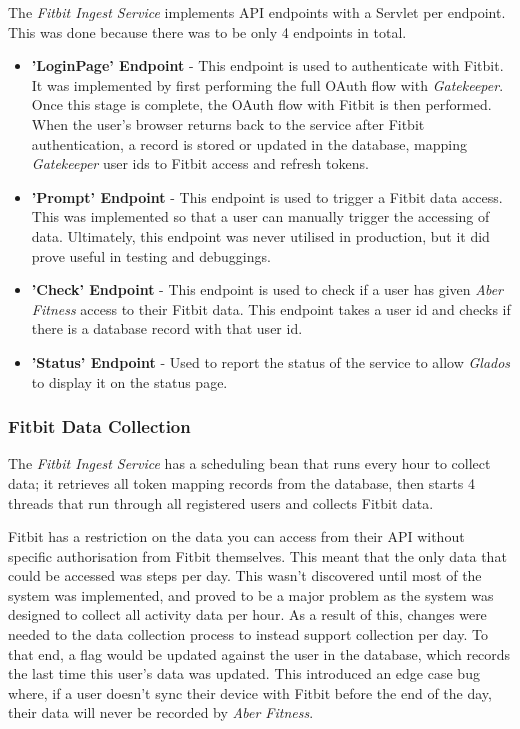The \textit{Fitbit Ingest Service} implements API endpoints with a Servlet per endpoint. This was done because there was to be only 4 endpoints in total.

\begin{itemize}
	\item \textbf{'LoginPage' Endpoint} - This endpoint is used to authenticate with Fitbit. It was implemented by first performing the full OAuth flow with \textit{Gatekeeper}. Once this stage is complete, the OAuth flow with Fitbit is then performed. When the user's browser returns back to the service after Fitbit authentication, a record is stored or updated in the database, mapping
	\textit{Gatekeeper} user ids to Fitbit access and refresh tokens.

	\item \textbf{'Prompt' Endpoint} - This endpoint is used to trigger a Fitbit data access. This was implemented so that a user can manually trigger the accessing of data. Ultimately, this endpoint was never utilised in production, but it did prove useful in testing and debuggings.

	\item \textbf{'Check' Endpoint} - This endpoint is used to check if a user has given \textit{Aber Fitness} access to their Fitbit data. This endpoint takes a user id and checks if there is a database record with that user id.

    \item \textbf{'Status' Endpoint} - Used to report the status of the service to allow \textit{Glados} to display it on the status page.
\end{itemize}

\subsubsection{Fitbit Data Collection}

The \textit{Fitbit Ingest Service} has a scheduling bean that runs every hour to collect data; it retrieves all token mapping records from the database, then starts 4 threads that run through all registered users and collects Fitbit data.

Fitbit has a restriction on the data you can access from their API without specific authorisation from Fitbit themselves. This meant that the only data that could be accessed was steps per day. This wasn't discovered until most of the system was implemented, and proved to be a major problem as the system was designed to collect all activity data per hour. As a result of this, changes were needed to the data collection process to instead support collection per day. To that end, a flag would be updated against the user in the database, which records the last time this user's data was updated. This introduced an edge case bug where, if a user doesn't sync their device with Fitbit before the end of the day, their data will never be recorded by \textit{Aber Fitness}.

